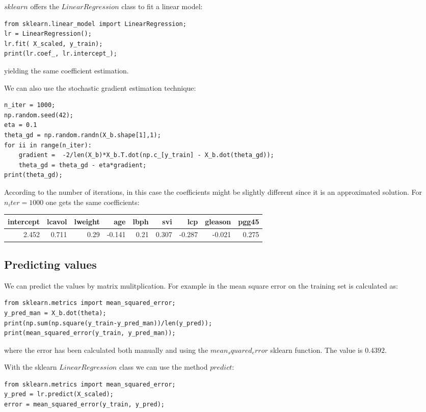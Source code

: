 \documentclass[12pt, letterpaper]{article}
\theoremstyle{definition}
\begin{document}
$sklearn$ offers the $LinearRegression$ class to fit a linear model:
\begin{lstlisting}
from sklearn.linear_model import LinearRegression;
lr = LinearRegression();
lr.fit( X_scaled, y_train);
print(lr.coef_, lr.intercept_);
\end{lstlisting}
yielding the same coefficient estimation.

We can also use the stochastic gradient estimation technique:
\begin{lstlisting}
n_iter = 1000;
np.random.seed(42);
eta = 0.1
theta_gd = np.random.randn(X_b.shape[1],1);
for ii in range(n_iter):
    gradient =  -2/len(X_b)*X_b.T.dot(np.c_[y_train] - X_b.dot(theta_gd));
    theta_gd = theta_gd - eta*gradient;
print(theta_gd);
\end{lstlisting}
According to the number of iterations, in this case the coefficients might be slightly different since it is an approximated solution. For $n_iter=1000$ one gets the same coefficients:

\begin{tabular}{rrrrrrrrr}
\toprule
 intercept &  lcavol &  lweight &    age &  lbph &    svi &    lcp &  gleason &  pgg45 \\
\midrule
     2.452 &   0.711 &     0.29 & -0.141 &  0.21 &  0.307 & -0.287 &   -0.021 &  0.275 \\
\bottomrule
\end{tabular}


\subsection{Predicting values}
We can predict the values by matrix mulitplication. For example in the mean square error on the training set is calculated as:
\begin{lstlisting}
from sklearn.metrics import mean_squared_error;
y_pred_man = X_b.dot(theta);
print(np.sum(np.square(y_train-y_pred_man))/len(y_pred));
print(mean_squared_error(y_train, y_pred_man));
\end{lstlisting}
where the error has been calculated both manually and using the $mean_squared_error$ sklearn function. The value is $0.4392$.

With the sklearn $LinearRegression$ class we can use the method $predict$:
\begin{lstlisting}
from sklearn.metrics import mean_squared_error;
y_pred = lr.predict(X_scaled);
error = mean_squared_error(y_train, y_pred);
\end{lstlisting}
\end{document}
